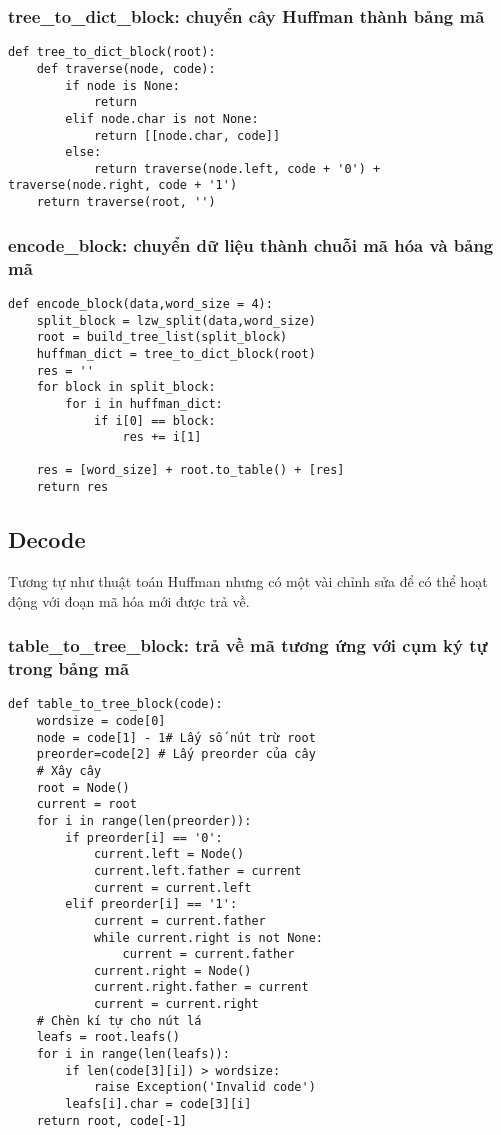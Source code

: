     \subsubsection{tree\_to\_dict\_block: chuyển cây Huffman thành bảng mã}
        \begin{lstlisting}
def tree_to_dict_block(root):
    def traverse(node, code):
        if node is None:
            return
        elif node.char is not None:
            return [[node.char, code]]
        else:
            return traverse(node.left, code + '0') + traverse(node.right, code + '1')
    return traverse(root, '')
        \end{lstlisting}
    \subsubsection{encode\_block: chuyển dữ liệu thành chuỗi mã hóa và bảng mã}

        \begin{lstlisting}
def encode_block(data,word_size = 4):
    split_block = lzw_split(data,word_size)
    root = build_tree_list(split_block)
    huffman_dict = tree_to_dict_block(root)
    res = ''
    for block in split_block:
        for i in huffman_dict:
            if i[0] == block:
                res += i[1]

    res = [word_size] + root.to_table() + [res]
    return res
        \end{lstlisting}

\subsection{Decode}
    Tương tự như thuật toán Huffman nhưng có một vài chỉnh sửa để có thể hoạt động với đoạn mã hóa mới được trả về.
    \subsubsection{table\_to\_tree\_block: trả về mã tương ứng với cụm ký tự trong bảng mã}
        \begin{lstlisting}
def table_to_tree_block(code):
    wordsize = code[0]
    node = code[1] - 1# Lấy số nút trừ root
    preorder=code[2] # Lấy preorder của cây
    # Xây cây
    root = Node()
    current = root 
    for i in range(len(preorder)):
        if preorder[i] == '0':
            current.left = Node()
            current.left.father = current
            current = current.left
        elif preorder[i] == '1':
            current = current.father
            while current.right is not None:
                current = current.father
            current.right = Node()
            current.right.father = current
            current = current.right
    # Chèn kí tự cho nút lá
    leafs = root.leafs()
    for i in range(len(leafs)):
        if len(code[3][i]) > wordsize:
            raise Exception('Invalid code')
        leafs[i].char = code[3][i]
    return root, code[-1]
        \end{lstlisting}
